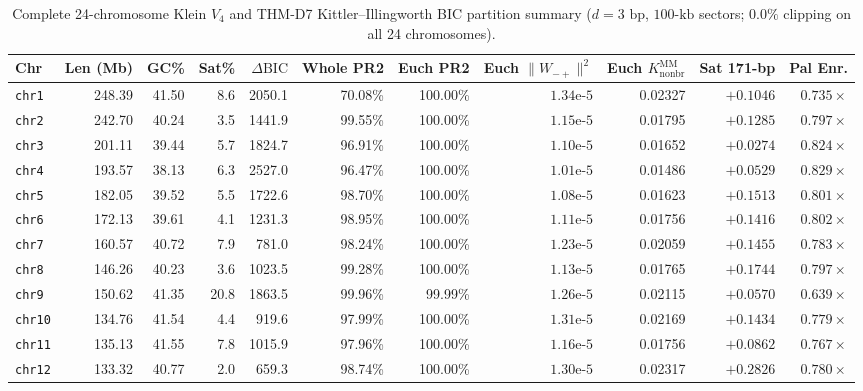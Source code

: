 \documentclass[11pt,a4paper]{article}
\newcommand{\Wmp}{W_{-+}}
\newcommand{\dBIC}{\Delta\mathrm{BIC}}
\begin{document}
\begin{table}[htbp]
\centering
\caption{Complete 24-chromosome Klein $V_4$ and THM-D7 Kittler--Illingworth BIC partition summary ($d=3\text{ bp}$, $100\text{-kb}$ sectors; $0.0\%$ clipping on all 24 chromosomes).}
\label{tab:chr24}
\scriptsize
\setlength{\tabcolsep}{3.4pt}
\begin{tabular}{@{}lrrrrrrrrrr@{}}
\toprule
\textbf{Chr} & \textbf{Len (Mb)} & \textbf{GC\%} & \textbf{Sat\%} & $\dBIC$ & \textbf{Whole PR2} & \textbf{Euch PR2} & \textbf{Euch $\|\Wmp\|^2$} & \textbf{Euch $K_{\mathrm{nonbr}}^{\mathrm{MM}}$} & \textbf{Sat 171-bp} & \textbf{Pal Enr.} \\
\midrule
\texttt{chr1}  & 248.39 & 41.50 &  8.6 & 2050.1 & 70.08\% & 100.00\% & $1.34\text{e-}5$ & 0.02327 & $+0.1046$ & $0.735\times$ \\
\texttt{chr2}  & 242.70 & 40.24 &  3.5 & 1441.9 & 99.55\% & 100.00\% & $1.15\text{e-}5$ & 0.01795 & $+0.1285$ & $0.797\times$ \\
\texttt{chr3}  & 201.11 & 39.44 &  5.7 & 1824.7 & 96.91\% & 100.00\% & $1.10\text{e-}5$ & 0.01652 & $+0.0274$ & $0.824\times$ \\
\texttt{chr4}  & 193.57 & 38.13 &  6.3 & 2527.0 & 96.47\% & 100.00\% & $1.01\text{e-}5$ & 0.01486 & $+0.0529$ & $0.829\times$ \\
\texttt{chr5}  & 182.05 & 39.52 &  5.5 & 1722.6 & 98.70\% & 100.00\% & $1.08\text{e-}5$ & 0.01623 & $+0.1513$ & $0.801\times$ \\
\texttt{chr6}  & 172.13 & 39.61 &  4.1 & 1231.3 & 98.95\% & 100.00\% & $1.11\text{e-}5$ & 0.01756 & $+0.1416$ & $0.802\times$ \\
\texttt{chr7}  & 160.57 & 40.72 &  7.9 &  781.0 & 98.24\% & 100.00\% & $1.23\text{e-}5$ & 0.02059 & $+0.1455$ & $0.783\times$ \\
\texttt{chr8}  & 146.26 & 40.23 &  3.6 & 1023.5 & 99.28\% & 100.00\% & $1.13\text{e-}5$ & 0.01765 & $+0.1744$ & $0.797\times$ \\
\texttt{chr9}  & 150.62 & 41.35 & 20.8 & 1863.5 & 99.96\% &  99.99\% & $1.26\text{e-}5$ & 0.02115 & $+0.0570$ & $0.639\times$ \\
\texttt{chr10} & 134.76 & 41.54 &  4.4 &  919.6 & 97.99\% & 100.00\% & $1.31\text{e-}5$ & 0.02169 & $+0.1434$ & $0.779\times$ \\
\texttt{chr11} & 135.13 & 41.55 &  7.8 & 1015.9 & 97.96\% & 100.00\% & $1.16\text{e-}5$ & 0.01756 & $+0.0862$ & $0.767\times$ \\
\texttt{chr12} & 133.32 & 40.77 &  2.0 &  659.3 & 98.74\% & 100.00\% & $1.30\text{e-}5$ & 0.02317 & $+0.2826$ & $0.780\times$ \\

\end{tabular}
\end{table}
\end{document}
